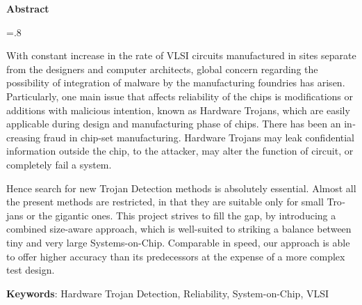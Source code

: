 


\pagestyle{empty}

\begin{latin}

\begin{center}
\textbf{Abstract}
\end{center}
\baselineskip=.8\baselineskip

With constant increase in the rate of VLSI circuits manufactured in sites separate from the designers and computer architects, global concern regarding the possibility of integration of malware by the manufacturing foundries has arisen. Particularly, one main issue that affects reliability of the chips is modifications or additions with malicious intention, known as Hardware Trojans, which are easily applicable during design and manufacturing phase of chips. There has been an increasing fraud in chip-set manufacturing. Hardware Trojans may leak confidential information outside the chip, to the attacker, may alter the function of circuit, or completely fail a system.

 Hence search for new Trojan Detection methods is absolutely essential. Almost all the present methods are restricted, in that they are suitable only for small Trojans or the gigantic ones. This project strives to fill the gap, by introducing a combined size-aware approach, which is well-suited to striking a balance between tiny and very large Systems-on-Chip. Comparable in speed, our approach is able to offer higher accuracy than its predecessors at the expense of a more complex test design. 


\bigskip\noindent\textbf{Keywords}:
Hardware Trojan Detection, Reliability, System-on-Chip, VLSI

\end{latin}

\newpage
